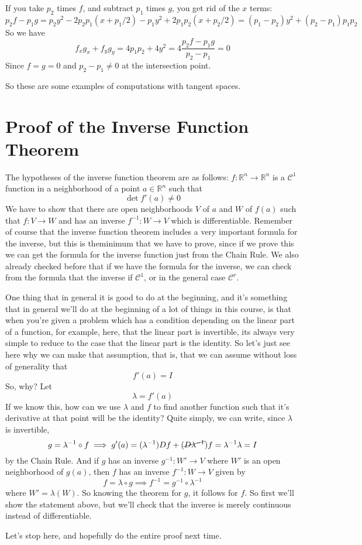 \documentclass{article}
\newcommand{\reals}[0]{\mathbb{R}}
\newcommand{\mc}[1]{\mathcal{#1}}
\begin{document}
\begin{enumerate}
  If you take \(p_2\) times \(f\), and subtract \(p_1\) times \(g\), you get rid of the \(x\) terms:
  \[p_2f - p_1g = p_2y^2 - 2p_2p_1(x + p_1/2) - p_1y^2 + 2p_1p_2(x + p_2/2) = (p_1 - p_2)y^2 + (p_2 - p_1)p_1p_2\]
  So we have
  \[f_xg_x + f_yg_y = 4p_1p_2 + 4y^2 = 4\frac{p_2f - p_1g}{p_2 - p_1} = 0\]
  Since \(f = g = 0\) and \(p_2 - p_1 \neq 0\) at the intersection point.

\end{enumerate}
So these are some examples of computations with tangent spaces.

\section*{Proof of the Inverse Function Theorem}
The hypotheses of the inverse function theorem are as follows: \(f: \reals^n \to \reals^n\) is a \(\mc{C}^1\) function in a neighborhood of a point \(a \in \reals^n\) such that
\[\det f'(a) \neq 0\]
We have to show that there are open neighborhoods \(V\) of \(a\) and \(W\) of \(f(a)\) such that \(f: V \to W\) and has an inverse \(f^{-1}: W \to V\) which is differentiable. Remember of course that the inverse function theorem includes a very important formula for the inverse, but this is theminimum that we have to prove, since if we prove this we can get the formula for the inverse function just from the Chain Rule. We also already checked before that if we have the formula for the inverse, we can check from the formula that the inverse if \(\mc{C}^1\), or in the general case \(\mc{C}^r\).

One thing that in general it is good to do at the beginning, and it's something that in general we'll do at the beginning of a lot of things in this course, is that when you're given a problem which has a condition depending on the linear part of a function, for example, here, that the linear part is invertible, its always very simple to reduce to the case that the linear part is the identity. So let's just see here why we can make that assumption, that is, that we can assume without loss of generality that
\[f'(a) = I\]
So, why? Let
\[\lambda = f'(a)\]
If we know this, how can we use \(\lambda\) and \(f\) to find another function such that it's derivative at that point will be the identity? Quite simply, we can write, since \(\lambda\) is invertible,
\[g = \lambda^{-1} \circ f \implies g'(a) = (\lambda^{-1})Df + (\cancel{D\lambda^{-1}})f = \lambda^{-1}\lambda = I\]
by the Chain Rule. And if \(g\) has an inverse \(g^{-1}: W' \to V\) where \(W'\) is an open neighborhood of \(g(a)\), then \(f\) has an inverse \(f^{-1}: W \to V\) given by
\[f = \lambda \circ g \implies f^{-1} = g^{-1} \circ \lambda^{-1}\]
where \(W' = \lambda(W)\). So knowing the theorem for \(g\), it follows for \(f\).
So first we'll show the statement above, but we'll check that the inverse is merely continuous instead of differentiable.

Let's stop here, and hopefully do the entire proof next time.
\end{document}
